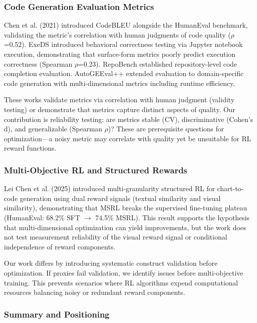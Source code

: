 \subsubsection{Code Generation Evaluation Metrics}

Chen et al. (2021) introduced CodeBLEU alongside the HumanEval benchmark, validating the metric's correlation with human judgments of code quality ($\rho$=0.52). ExeDS introduced behavioral correctness testing via Jupyter notebook execution, demonstrating that surface-form metrics poorly predict execution correctness (Spearman $\rho$=0.23). RepoBench established repository-level code completion evaluation. AutoGEEval++ extended evaluation to domain-specific code generation with multi-dimensional metrics including runtime efficiency.

These works validate metrics via correlation with human judgment (validity testing) or demonstrate that metrics capture distinct aspects of quality. Our contribution is reliability testing: are metrics stable (CV), discriminative (Cohen's d), and generalizable (Spearman $\rho$)? These are prerequisite questions for optimization---a noisy metric may correlate with quality yet be unsuitable for RL reward functions.

\subsubsection{Multi-Objective RL and Structured Rewards}

Lei Chen et al. (2025) introduced multi-granularity structured RL for chart-to-code generation using dual reward signals (textual similarity and visual similarity), demonstrating that MSRL breaks the supervised fine-tuning plateau (HumanEval: 68.2\% SFT $\rightarrow$ 74.5\% MSRL). This result supports the hypothesis that multi-dimensional optimization can yield improvements, but the work does not test measurement reliability of the visual reward signal or conditional independence of reward components.

Our work differs by introducing systematic construct validation before optimization. If proxies fail validation, we identify issues before multi-objective training. This prevents scenarios where RL algorithms expend computational resources balancing noisy or redundant reward components.

\subsubsection{Summary and Positioning}

